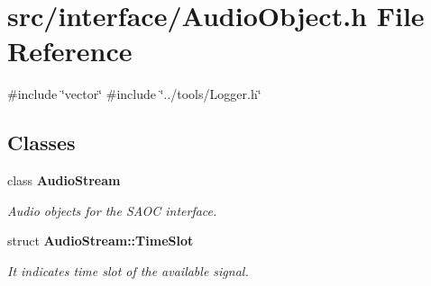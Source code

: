\section{src/interface/\+Audio\+Object.h File Reference}
\label{_audio_object_8h}
{\ttfamily \#include \char`\"{}vector\char`\"{}}\newline
{\ttfamily \#include \char`\"{}../tools/\+Logger.\+h\char`\"{}}\newline
\subsection*{Classes}
\begin{DoxyCompactItemize}
\item 
class \textbf{ Audio\+Stream}
\begin{DoxyCompactList}\small\item\em Audio objects for the S\+A\+OC interface. \end{DoxyCompactList}\item 
struct \textbf{ Audio\+Stream\+::\+Time\+Slot}
\begin{DoxyCompactList}\small\item\em It indicates time slot of the available signal. \end{DoxyCompactList}\end{DoxyCompactItemize}
